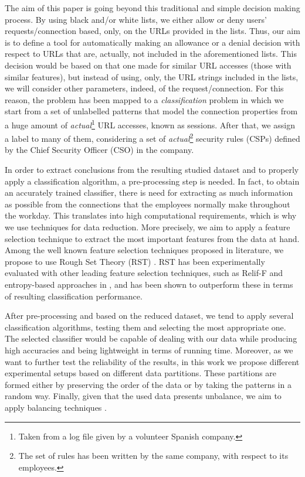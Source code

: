 \documentclass{llncs}
\begin{document}
The aim of this paper is going beyond this traditional and simple decision making process. By using black and/or white lists, we either allow or deny users' requests/connection based, only, on the URLs provided in the lists. Thus, our aim is to define a tool for automatically making an allowance or a denial decision with respect to URLs that are, actually, not included in the aforementioned lists. This decision would be based on that one made for similar URL accesses (those with similar features), but instead of using, only, the URL strings included in the lists, we will consider other parameters, indeed, of the request/connection.
For this reason, the problem has been mapped to a \textit{classification} problem in which we start from a set of unlabelled patterns that model the connection properties from a huge amount of \textit{actual}\footnote{Taken from a log file given by a volunteer Spanish company.} URL accesses, known as sessions. After that, we assign a label to many of them, considering a set of \textit{actual}\footnote{The set of rules has been written by the same company, with respect to its employees.} security rules (CSPs) defined by the Chief Security Officer (CSO) in the company.

In order to extract conclusions from the resulting studied dataset and to properly apply a classification algorithm, a pre-processing step is needed. In fact, to obtain an accurately trained classifier, there is need for extracting as much information as possible from the connections that the employees normally make throughout the workday. This translates into high computational requirements, which is why we use techniques for data reduction. More precisely, we aim to apply a feature selection technique to extract the most important features from the data at hand. Among the well known feature selection techniques proposed in literature, we propose to use Rough Set Theory (RST) \cite{pawlak2008rough}. RST has been experimentally evaluated with other leading feature selection techniques, such as Relif-F and entropy-based approaches in \cite{jensen2007fuzzy}, and has been shown to outperform these in terms of resulting classification performance.
 
After pre-processing and based on the reduced dataset, we tend to apply several classification algorithms, testing them and selecting the most appropriate one. The selected classifier would be capable of dealing with our data while producing high accuracies and being lightweight in terms of running time. Moreover, as we want to further test the reliability of the results, in this work we propose different experimental setups based on different data partitions. These partitions are formed either by preserving the order of the data or by taking the patterns in a random way. Finally, given that the used data presents unbalance, we aim to apply balancing techniques \cite{imbalance_techniques_02}.
\end{document}
